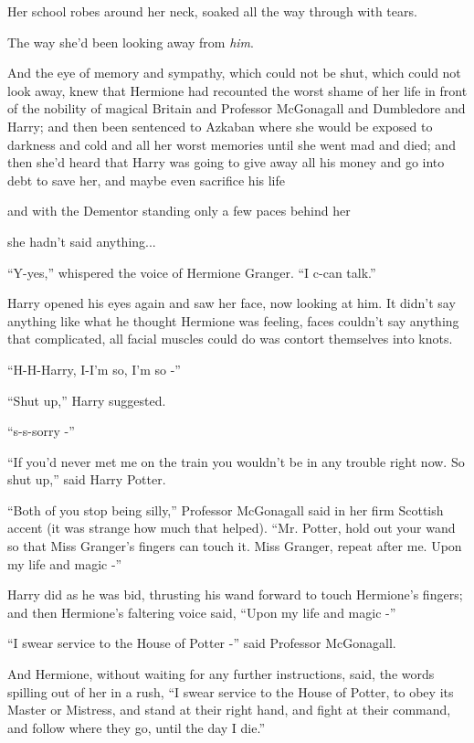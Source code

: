 Her school robes around her neck, soaked all the way through with tears.

The way she'd been looking away from \emph{him}.

And the eye of memory and sympathy, which could not be shut, which could
not look away, knew that Hermione had recounted the worst shame of her
life in front of the nobility of magical Britain and Professor
McGonagall and Dumbledore and Harry; and then been sentenced to Azkaban
where she would be exposed to darkness and cold and all her worst
memories until she went mad and died; and then she'd heard that Harry
was going to give away all his money and go into debt to save her, and
maybe even sacrifice his life

and with the Dementor standing only a few paces behind her

she hadn't said anything...

``Y-yes,'' whispered the voice of Hermione Granger. ``I c-can talk.''

Harry opened his eyes again and saw her face, now looking at him. It
didn't say anything like what he thought Hermione was feeling, faces
couldn't say anything that complicated, all facial muscles could do was
contort themselves into knots.

``H-H-Harry, I-I'm so, I'm so -''

``Shut up,'' Harry suggested.

``s-s-sorry -''

``If you'd never met me on the train you wouldn't be in any trouble
right now. So shut up,'' said Harry Potter.

``Both of you stop being silly,'' Professor McGonagall said in her firm
Scottish accent (it was strange how much that helped). ``Mr. Potter,
hold out your wand so that Miss Granger's fingers can touch it. Miss
Granger, repeat after me. Upon my life and magic -''

Harry did as he was bid, thrusting his wand forward to touch Hermione's
fingers; and then Hermione's faltering voice said, ``Upon my life and
magic -''

``I swear service to the House of Potter -'' said Professor McGonagall.

And Hermione, without waiting for any further instructions, said, the
words spilling out of her in a rush, ``I swear service to the House of
Potter, to obey its Master or Mistress, and stand at their right hand,
and fight at their command, and follow where they go, until the day I
die.''

